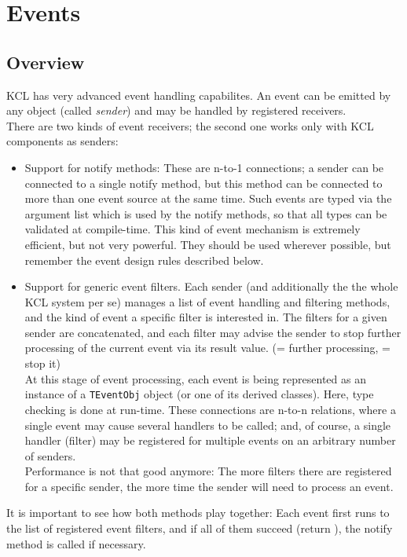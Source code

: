 
\chapter{Events}


\section{Overview}
KCL has very advanced event handling capabilites. An event can be emitted by
any object (called \textit{sender}) and may be handled by registered receivers.
\\ There are two kinds of event receivers; the second one works only with KCL
components as senders:
\begin{itemize}
\item Support for notify methods: These are n-to-1 connections; a sender can
      be connected to a single notify method, but this method can be connected
      to more than one event source at the same time.
      Such events are typed via the argument list which is used by
      the notify methods, so that all types can be validated at compile-time.
      This kind of event mechanism is extremely efficient, but not very
      powerful. They should be used wherever possible, but remember the event
      design rules described below.
\item Support for generic event filters. Each sender (and additionally the
      the whole KCL system per se) manages a list of event handling and
      filtering methods, and the kind of event a specific filter is interested
      in. The filters for a given sender are concatenated, and each filter may
      advise the sender to stop further processing of the current event via its
      result value. (\true = further processing, \false = stop it)\\
      At this stage of event processing, each event is being represented
      as an instance of a \texttt{TEventObj} object (or one of its derived
      classes). Here, type checking is done at run-time. These connections are
      n-to-n relations, where a single event may cause several handlers to
      be called; and, of course, a single handler (filter) may be registered
      for multiple events on an arbitrary number of senders.\\
      Performance is not that good anymore: The more filters there are
      registered for a specific sender, the more time the sender will need to
      process an event.
\end{itemize}
It is important to see how both methods play together: Each event first runs to
the list of registered event filters, and if all of them succeed (return \true),
the notify method is called if necessary.\\
